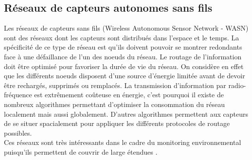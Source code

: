\documentclass[10pt, article]{llncs}
\begin{document}
		\subsection{Réseaux de capteurs autonomes sans fils}
			Les réseaux de capteurs sans fils (Wireless Autonomous Sensor Network - WASN) sont des réseaux dont les capteurs sont distribués dans l'espace et le temps. La spécificité de ce type de réseau est qu'ils doivent pouvoir se montrer redondants face à une défaillance de l'un des noeuds du réseau. Le routage de l'information doit être optimisé pour favoriser la durée de vie du réseau. On considère en effet que les différents noeuds disposent d'une source d'énergie limitée avant de devoir être rechargés, supprimés ou remplacés. La transmission d'information par radio-fréquence est extrêmement coûteuse en énergie, c'est pourquoi il existe de nombreux algorithmes permettant d'optimiser la consommation du réseau localement mais aussi globalement. D'autres algorithmes permettent aux capteurs de se situer spacialement pour appliquer les différents protocoles de routage possibles.\\
			Ces réseaux sont très intéressants dans le cadre du monitoring environnemental puisqu'ils permettent de couvrir de large étendues \cite{professor_course_2018}.
		
\end{document}
